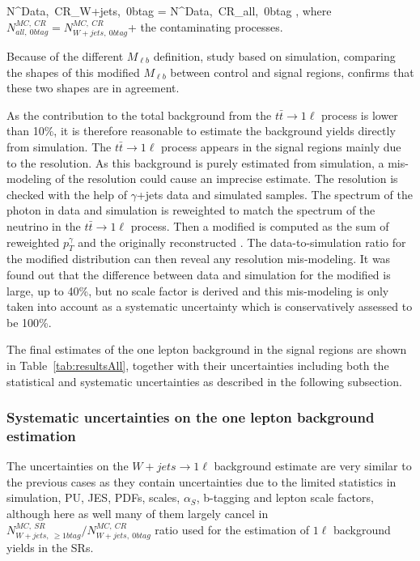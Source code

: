 {
N^{Data,~CR}_{W+jets,~0btag} = N^{Data,~CR}_{all,~0btag} \times {} ,
}
where $ N^{MC,~CR}_{all,~0btag} = N^{MC,~CR}_{W+jets,~0btag}$+ the contaminating processes.

Because of the different $M_{\ell b}$ definition, study based on simulation, comparing the shapes of this modified $M_{\ell b}$ between control and signal regions, confirms that these two shapes are in agreement. 

As the contribution to the total background from the $t\bar{t} \to 1\ell$ process is lower than 10\%, it is therefore reasonable to estimate the background yields directly from simulation. The $t\bar{t} \to 1\ell$ process appears in the signal regions mainly due to the \MET resolution. As this background is purely estimated from simulation, a mis-modeling of the \MET resolution could cause an imprecise estimate. The \MET resolution is checked with the help of $\gamma$+jets data and simulated samples. The \pt spectrum of the photon in data and simulation is reweighted to match the \pt spectrum of the neutrino in the $t\bar{t} \to 1\ell$ process. Then a modified \MET is computed as the sum of reweighted $p_{T}^{\gamma}$ and the originally reconstructed \MET. The data-to-simulation ratio for the modified \MET distribution can then reveal any \MET resolution mis-modeling. It was found out that the difference between data and simulation for the modified \MET is large, up to 40\%, but no scale factor is derived and this mis-modeling is only taken into account as a systematic uncertainty which is conservatively assessed to be 100\%. %
 
The final estimates of the one lepton background in the signal regions are shown in Table~\ref{tab:resultsAll}, together with their uncertainties including both the statistical and systematic uncertainties as described in the following subsection.

\subsubsection{Systematic uncertainties on the one lepton background estimation}

The uncertainties on the $W+jets \to 1\ell$  background estimate are very similar to the previous cases as they contain uncertainties due to the limited statistics in simulation, PU, JES, PDFs, scales, $\alpha_{S}$, b-tagging and lepton scale factors, although here as well many of them largely cancel in $N^{MC,~SR}_{W+jets,~\geq 1btag}/ N^{MC,~CR}_{W+jets,~0btag}$ ratio used for the estimation of $1\ell$ background yields in the SRs.

